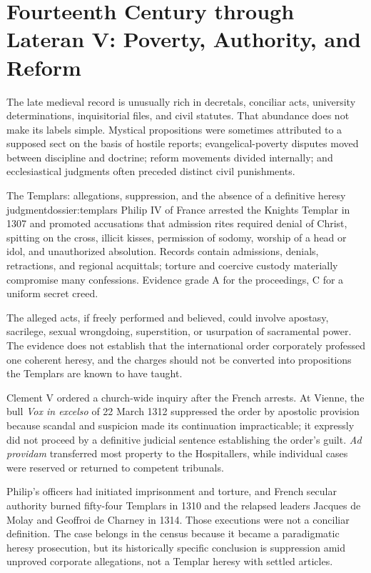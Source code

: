 \section{Fourteenth Century through Lateran V: Poverty, Authority, and Reform}

The late medieval record is unusually rich in decretals, conciliar acts, university determinations, inquisitorial files, and civil statutes. That abundance does not make its labels simple. Mystical propositions were sometimes attributed to a supposed sect on the basis of hostile reports; evangelical-poverty disputes moved between discipline and doctrine; reform movements divided internally; and ecclesiastical judgments often preceded distinct civil punishments.

\begin{heresydossier}{The Templars: allegations, suppression, and the absence of a definitive heresy judgment}{dossier:templars}
\objectfield Philip IV of France arrested the Knights Templar in 1307 and promoted accusations that admission rites required denial of Christ, spitting on the cross, illicit kisses, permission of sodomy, worship of a head or idol, and unauthorized absolution. Records contain admissions, denials, retractions, and regional acquittals; torture and coercive custody materially compromise many confessions. Evidence grade A for the proceedings, C for a uniform secret creed.

\propositionfield The alleged acts, if freely performed and believed, could involve apostasy, sacrilege, sexual wrongdoing, superstition, or usurpation of sacramental power. The evidence does not establish that the international order corporately professed one coherent heresy, and the charges should not be converted into propositions the Templars are known to have taught.

\responsefield Clement V ordered a church-wide inquiry after the French arrests. At Vienne, the bull \emph{Vox in excelso} of 22 March 1312 suppressed the order by apostolic provision because scandal and suspicion made its continuation impracticable; it expressly did not proceed by a definitive judicial sentence establishing the order's guilt. \emph{Ad providam} transferred most property to the Hospitallers, while individual cases were reserved or returned to competent tribunals.

\aftermathfield Philip's officers had initiated imprisonment and torture, and French secular authority burned fifty-four Templars in 1310 and the relapsed leaders Jacques de Molay and Geoffroi de Charney in 1314. Those executions were not a conciliar definition. The case belongs in the census because it became a paradigmatic heresy prosecution, but its historically specific conclusion is suppression amid unproved corporate allegations, not a Templar heresy with settled articles.
\end{heresydossier}

